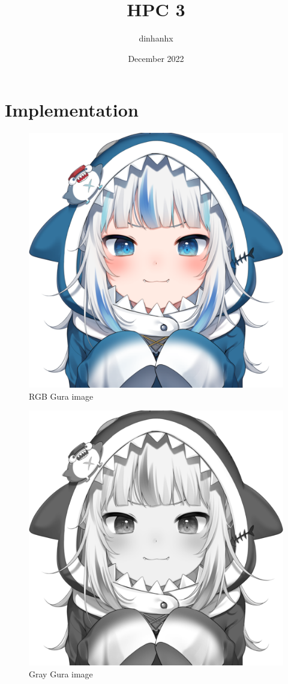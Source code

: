 \documentclass{article}
\title{HPC 3}
\author{dinhanhx }
\date{December 2022}
\begin{document}
\maketitle

\section{Implementation}

\begin{figure}[htbp]
    \centering
    \includegraphics[scale=0.8]{gura.png}
    \caption{RGB Gura image}
    \label{fig:rgb}
\end{figure}

\begin{figure}[htbp]
    \centering
    \includegraphics[scale=0.2]{gray_gura.png}
    \caption{Gray Gura image}
    \label{fig:gray}
\end{figure}
\end{document}
